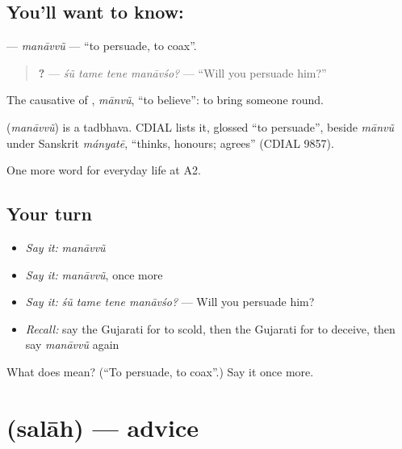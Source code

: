 \subsection*{You'll want to know: }
\textbf{} — \emph{manāvvũ} — \textquotedblleft{}to persuade, to coax\textquotedblright{}.

\begin{quote}
\textbf{   ?} — \emph{śũ tame tene manāvśo?} — \textquotedblleft{}Will you persuade him?\textquotedblright{}
\end{quote}

The causative of \textbf{}, \emph{mānvũ}, \textquotedblleft{}to believe\textquotedblright{}: to bring someone round.

\begin{cousinweb}
\textbf{} (\emph{manāvvũ}) is a tadbhava. CDIAL lists it, glossed \textquotedblleft{}to persuade\textquotedblright{}, beside \emph{mānvũ} under Sanskrit \emph{mányatē}, \textquotedblleft{}thinks, honours; agrees\textquotedblright{} (CDIAL 9857).
\end{cousinweb}

\begin{grammarlens}[title={What you've built}]
One more word for everyday life at A2.
\end{grammarlens}

\subsection*{Your turn}
\begin{itemize}
\raggedright
  \item \emph{Say it:} \emph{manāvvũ}
  \item \emph{Say it:} \emph{manāvvũ}, once more
  \item \emph{Say it:} \emph{śũ tame tene manāvśo?} — Will you persuade him?
  \item \emph{Recall:} say the Gujarati for to scold, then the Gujarati for to deceive, then say \emph{manāvvũ} again
\end{itemize}

\begin{tcolorbox}[breakable,colback=teal!4,colframe=teal!35!black,title={Before you move on}]
What does  mean? (\textquotedblleft{}To persuade, to coax\textquotedblright{}.) Say it once more.
\end{tcolorbox}
\section[\texorpdfstring{\gu{સલાહ} (salāh)}{સલાહ (salāh)}]{ (salāh) — advice}

